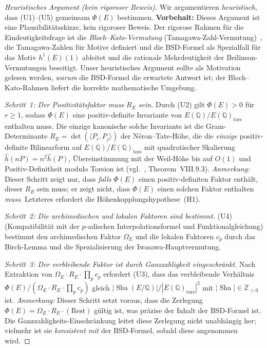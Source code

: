 \documentclass[aps,prd,twocolumn,superscriptaddress,nofootinbib,floatfix]{revtex4-2}
\theoremstyle{definition}
\theoremstyle{remark}
\DeclareMathOperator{\Sha}{Sha}
\begin{document}
\begin{proof}[Heuristisches Argument (kein rigoroser Beweis)]
Wir argumentieren \textit{heuristisch}, dass (U1)--(U5) gemeinsam $\Phi(E)$ bestimmen. \textbf{Vorbehalt:} Dieses Argument ist eine Plausibilitätsskizze, kein rigoroser Beweis. Der rigorose Rahmen für die Eindeutigkeitsfrage ist die \textit{Bloch--Kato-Vermutung} (Tamagawa-Zahl-Vermutung)~\cite{BlochKato1990,FontainePerrinRiou1994}, die Tamagawa-Zahlen für Motive definiert und die BSD-Formel als Spezialfall für das Motiv $h^1(E)(1)$ ableitet und die rationale Mehrdeutigkeit der Beilinson-Vermutungen beseitigt. Unser heuristisches Argument sollte als Motivation gelesen werden, \textit{warum} die BSD-Formel die erwartete Antwort ist; der Bloch--Kato-Rahmen liefert die korrekte mathematische Umgebung.

\textit{Schritt~1: Der Positivitätsfaktor muss $R_E$ sein.} Durch (U2) gilt $\Phi(E) > 0$ für $r \geq 1$, sodass $\Phi(E)$ eine positiv-definite Invariante von $E(\mathbb{Q})/E(\mathbb{Q})_{\mathrm{tors}}$ enthalten muss. Die einzige kanonische solche Invariante ist die Gram-Determinante $R_E = \det(\langle P_i, P_j \rangle)$ der Néron--Tate-Höhe, die die \textit{einzige} positiv-definite Bilinearform auf $E(\mathbb{Q})/E(\mathbb{Q})_{\mathrm{tors}}$ mit quadratischer Skalierung $\hat{h}(nP) = n^2 \hat{h}(P)$, Übereinstimmung mit der Weil-Höhe bis auf $O(1)$ und Positiv-Definitheit modulo Torsion ist (vgl.~\cite{Silverman2009}, Theorem~VIII.9.3). \textit{Anmerkung:} Dieser Schritt zeigt nur, dass \textit{falls} $\Phi(E)$ einen positiv-definiten Faktor enthält, dieser $R_E$ sein muss; er zeigt nicht, dass $\Phi(E)$ einen solchen Faktor enthalten \textit{muss}. Letzteres erfordert die Höhenkopplungshypothese~(H1).

\textit{Schritt~2: Die archimedischen und lokalen Faktoren sind bestimmt.} (U4) (Kompatibilität mit der $p$-adischen Interpolationsformel und Funktionalgleichung) bestimmt den archimedischen Faktor $\Omega_E$ und die lokalen Faktoren $c_p$ durch das Birch-Lemma und die Spezialisierung der Iwasawa-Hauptvermutung.

\textit{Schritt~3: Der verbleibende Faktor ist durch Ganzzahligkeit eingeschränkt.} Nach Extraktion von $\Omega_E \cdot R_E \cdot \prod_p c_p$ erfordert (U3), dass das verbleibende Verhältnis $\Phi(E)/(\Omega_E \cdot R_E \cdot \prod_p c_p)$ gleich $|\Sha(E/\mathbb{Q})|/|E(\mathbb{Q})_{\mathrm{tors}}|^2$ mit $|\Sha| \in \mathbb{Z}_{>0}$ ist. \textit{Anmerkung:} Dieser Schritt setzt voraus, dass die Zerlegung $\Phi(E) = \Omega_E \cdot R_E \cdot (\text{Rest})$ gültig ist, was präzise der Inhalt der BSD-Formel ist. Die \glqq Ganzzahligkeits-Einschränkung\grqq{} leitet diese Zerlegung nicht unabhängig her; vielmehr ist sie \textit{konsistent mit} der BSD-Formel, sobald diese angenommen wird.


\end{proof}
\end{document}
